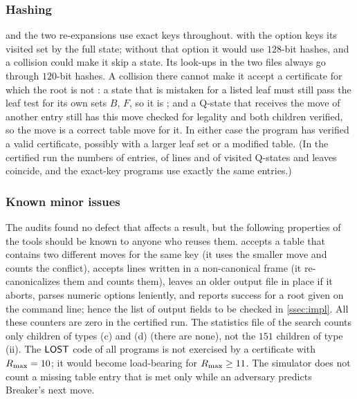 \subsubsection*{Hashing}
 and the two re-expansions use exact keys throughout.  with the option
 keys its visited set by the full state; without that option it would use $128$-bit hashes, and
a collision could make it skip a state. Its look-ups in the two files always go through $120$-bit hashes.
A collision there cannot make it accept a certificate for which the root is not \WON: a state that is
mistaken for a listed leaf must still pass the leaf test for its own sets $B$, $F$, so it is \WON{};
and a Q-state that receives the move of another entry still has this move checked for legality and both
children verified, so the move is a correct table move for it. In either case the program has verified a
valid certificate, possibly with a larger leaf set or a modified table. (In the certified run the numbers
of entries, of lines and of visited Q-states and leaves coincide, and the exact-key programs use exactly
the same entries.)

\subsubsection*{Known minor issues}
The audits found no defect that affects a result, but the following properties of the tools should be
known to anyone who reuses them.  accepts a table that contains two different moves for the
same key (it uses the smaller move and counts the conflict), accepts lines written in a non-canonical
frame (it re-canonicalizes them and counts them), leaves an older output file in place if it aborts,
parses numeric options leniently, and reports success for a \VOID{} root given on the command line; hence
the list of output fields to be checked in \cref{ssec:impl}. All these counters are zero in the certified
run. The statistics file of the search counts only \VOID{} children of types (c) and (d) (there are none),
not the $151$ \VOID{} children of type (ii). The $\mathsf{LOST}$ code of all programs is not exercised by a
certificate with $R_{\max}=10$; it would become load-bearing for $R_{\max}\ge11$. The simulator does not count a
missing table entry that is met only while an adversary predicts Breaker's next move.
